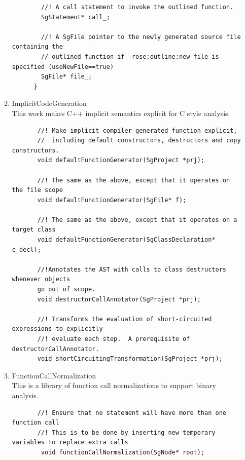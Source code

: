 \begin{enumerate}
\begin{enumerate}
\begin{lstlisting}
        //! A call statement to invoke the outlined function.
        SgStatement* call_;
      
        //! A SgFile pointer to the newly generated source file containing the
        // outlined function if -rose:outline:new_file is specified (useNewFile==true)
        SgFile* file_;
      }
       \end{lstlisting}

      \item ImplicitCodeGeneration \\
            This work makes C++ implicit semantics explicit for C style analysis.
       \begin{lstlisting}
       //! Make implicit compiler-generated function explicit,
       //  including default constructors, destructors and copy constructors.
       void defaultFunctionGenerator(SgProject *prj);

       //! The same as the above, except that it operates on the file scope
       void defaultFunctionGenerator(SgFile* f);

       //! The same as the above, except that it operates on a target class
       void defaultFunctionGenerator(SgClassDeclaration* c_decl);

       //!Annotates the AST with calls to class destructors whenever objects
       go out of scope.
       void destructorCallAnnotator(SgProject *prj);

       //! Transforms the evaluation of short-circuited expressions to explicitly
       //! evaluate each step.  A prerequisite of destructorCallAnnotator.
       void shortCircuitingTransformation(SgProject *prj);

       \end{lstlisting}
      

      \item FunctionCallNormalization \\
            This is a library of function call normalizations to support binary
            analysis.
       \begin{lstlisting}
       //! Ensure that no statement will have more than one function call
       //! This is to be done by inserting new temporary variables to replace extra calls
        void functionCallNormalization(SgNode* root);

       \end{lstlisting}


\end{enumerate}
\end{enumerate}
